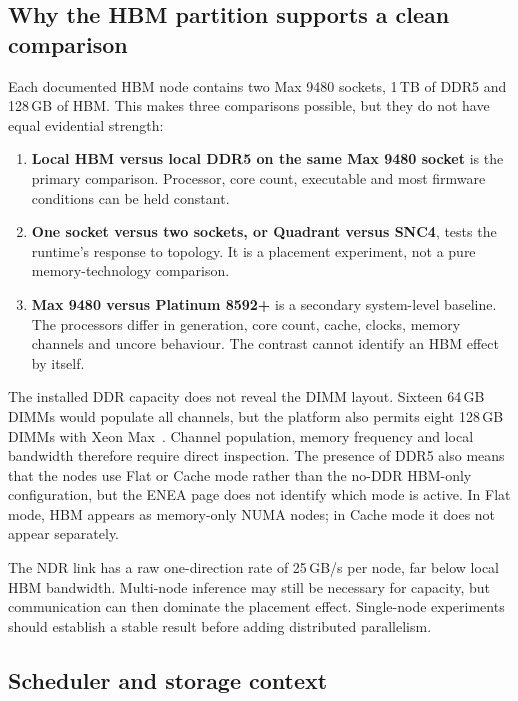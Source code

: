 \subsection{Why the HBM partition supports a clean comparison}

Each documented HBM node contains two Max 9480 sockets, 1\,TB of DDR5
and 128\,GB of HBM.  This makes three comparisons possible, but they do
not have equal evidential strength:

\begin{enumerate}
  \item \textbf{Local HBM versus local DDR5 on the same Max 9480
        socket} is the primary comparison.  Processor, core count,
        executable and most firmware conditions can be held constant.

  \item \textbf{One socket versus two sockets, or Quadrant versus SNC4},
        tests the runtime's response to topology.  It is a placement
        experiment, not a pure memory-technology comparison.

  \item \textbf{Max 9480 versus Platinum 8592+} is a secondary
        system-level baseline.  The processors differ in generation,
        core count, cache, clocks, memory channels and uncore behaviour.
        The contrast cannot identify an HBM effect by itself.
\end{enumerate}

The installed DDR capacity does not reveal the DIMM layout.  Sixteen
64\,GB DIMMs would populate all channels, but the platform also permits
eight 128\,GB DIMMs with Xeon Max~\cite{lp1603}.  Channel population,
memory frequency and local bandwidth therefore require direct
inspection.  The presence of DDR5 also means that the nodes use Flat or
Cache mode rather than the no-DDR HBM-only configuration, but the ENEA
page does not identify which mode is active.  In Flat mode, HBM appears
as memory-only NUMA nodes; in Cache mode it does not appear separately.

The NDR link has a raw one-direction rate of 25\,GB/s per node, far
below local HBM bandwidth.  Multi-node inference may still be necessary
for capacity, but communication can then dominate the placement effect.
Single-node experiments should establish a stable result before adding
distributed parallelism.

\subsection{Scheduler and storage context}

